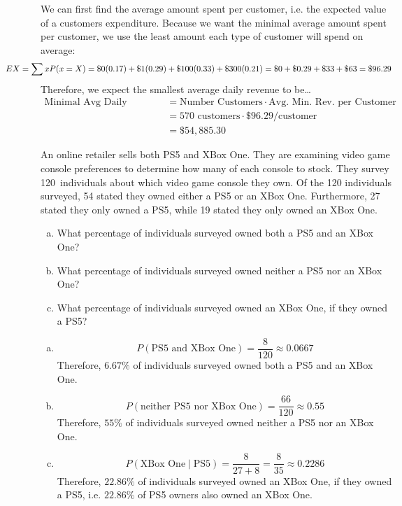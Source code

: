 \documentclass[12pt,letterpaper]{exam}
\begin{document}
\begin{questions}
\sol We can first find the average amount spent per customer, i.e. the expected value of a customers expenditure. Because we want the minimal average amount spent per customer, we use the least amount each type of customer will spend on average:
	\[
	\hspace{-1.5cm} EX= \sum x P(x= X)= \$0(0.17) + \$1(0.29) + \$100(0.33) + \$300(0.21)= \$0 + \$0.29 + \$33 + \$63= \$96.29
	\]
Therefore, we expect the smallest average daily revenue to be\dots
	\[
	\begin{aligned}
	\text{Minimal Avg Daily Revenue}&= \text{Number Customers} \cdot \text{Avg. Min. Rev. per Customer} \\
	&= 570 \text{ customers} \cdot \$96.29 \text{/customer} \\
	&= \$54,\!885.30
	\end{aligned}
	\]



\newpage
\question[10] An online retailer sells both PS5 and XBox One. They are examining video game console preferences to determine how many of each console to stock. They survey 120~individuals about which video game console they own. Of the 120 individuals surveyed, 54 stated they owned either a PS5 or an XBox One. Furthermore, 27 stated they only owned a PS5, while 19 stated they only owned an XBox One. 
        \begin{enumerate}[(a)]
        \item What percentage of individuals surveyed owned both a PS5 and an XBox One?
        \item What percentage of individuals surveyed owned neither a PS5 nor an XBox One?
        \item What percentage of individuals surveyed owned an XBox One, if they owned a PS5?
        \end{enumerate} \pspace

\begin{enumerate}[(a)]
\item 
	\[
	P(\text{PS5 and XBox One})= \dfrac{8}{120} \approx 0.0667
	\]
Therefore, $6.67\%$ of individuals surveyed owned both a PS5 and an XBox One. \pspace

\item 
	\[
	P(\text{neither PS5 nor XBox One})= \dfrac{66}{120} \approx 0.55
	\]
Therefore, $55\%$ of individuals surveyed owned neither a PS5 nor an XBox One. \pspace

\item 
	\[
	P(\text{XBox One} \;|\; \text{PS5})= \dfrac{8}{27 + 8}= \dfrac{8}{35} \approx 0.2286
	\]
Therefore, $22.86\%$ of individuals surveyed owned an XBox One, if they owned a PS5, i.e. $22.86\%$ of PS5 owners also owned an XBox One. 
\end{enumerate} \vfill


\end{questions}
\end{document}
